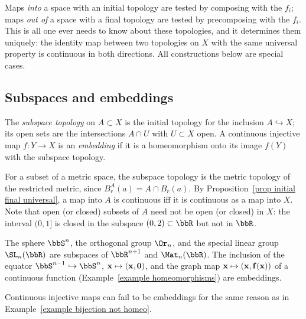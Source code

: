 \begin{intu*}
    Maps \emph{into} a space with an initial topology are tested by composing with the $f_i$; maps \emph{out of} a space with a final topology are tested by precomposing with the $f_i$. This is all one ever needs to know about these topologies, and it determines them uniquely: the identity map between two topologies on $X$ with the same universal property is continuous in both directions. All constructions below are special cases.
\end{intu*}

\subsection{Subspaces and embeddings}

\begin{defn}
    The \emph{subspace topology} on $A\subset X$ is the initial topology for the inclusion $A\hookrightarrow X$; its open sets are the intersections $A\cap U$ with $U\subset X$ open. A continuous injective map $f:Y\to X$ is an \emph{embedding} if it is a homeomorphism onto its image $f(Y)$ with the subspace topology.
\end{defn}

For a subset of a metric space, the subspace topology is the metric topology of the restricted metric, since $B^A_r(a)=A\cap B_r(a)$. By Proposition~\ref{prop initial final universal}, a map into $A$ is continuous iff it is continuous as a map into $X$. Note that open (or closed) subsets of $A$ need not be open (or closed) in $X$: the interval $(0,1]$ is closed in the subspace $(0,2)\subset\bbR$ but not in $\bbR$.

\begin{example}
    The sphere $\bbS^n$, the orthogonal group $\Or_n$, and the special linear group $\SL_n(\bbR)$ are subspaces of $\bbR^{n+1}$ and $\Mat_n(\bbR)$. The inclusion of the equator $\bbS^{n-1}\hookrightarrow\bbS^n$, $\bf{x}\mapsto(\bf{x},0)$, and the graph map $\bf{x}\mapsto(\bf{x},f(\bf{x}))$ of a continuous function (Example~\ref{example homeomorphisms}) are embeddings.
\end{example}

Continuous injective maps can fail to be embeddings for the same reason as in Example~\ref{example bijection not homeo}.

